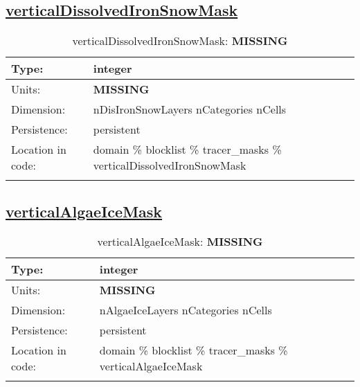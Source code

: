 \subsection[verticalDissolvedIronSnowMask]{\hyperref[sec:var_tab_tracer_masks]{verticalDissolvedIronSnowMask}}
\label{subsec:var_sec_tracer_masks_verticalDissolvedIronSnowMask}
\begin{center}
\begin{longtable}{| p{2.0in} | p{4.0in} |}
        \hline 
        Type: & integer \\
        \hline 
        Units: & {\bf \color{red} MISSING} \\
        \hline 
        Dimension: & nDisIronSnowLayers nCategories nCells \\
        \hline 
        Persistence: & persistent \\
        \hline 
         Location in code: & domain \% blocklist \% tracer\_masks \% verticalDissolvedIronSnowMask \\
         \hline 
    \caption{verticalDissolvedIronSnowMask: {\bf \color{red} MISSING}}
\end{longtable}
\end{center}
\subsection[verticalAlgaeIceMask]{\hyperref[sec:var_tab_tracer_masks]{verticalAlgaeIceMask}}
\label{subsec:var_sec_tracer_masks_verticalAlgaeIceMask}
\begin{center}
\begin{longtable}{| p{2.0in} | p{4.0in} |}
        \hline 
        Type: & integer \\
        \hline 
        Units: & {\bf \color{red} MISSING} \\
        \hline 
        Dimension: & nAlgaeIceLayers nCategories nCells \\
        \hline 
        Persistence: & persistent \\
        \hline 
         Location in code: & domain \% blocklist \% tracer\_masks \% verticalAlgaeIceMask \\
         \hline 
    \caption{verticalAlgaeIceMask: {\bf \color{red} MISSING}}
\end{longtable}
\end{center}
